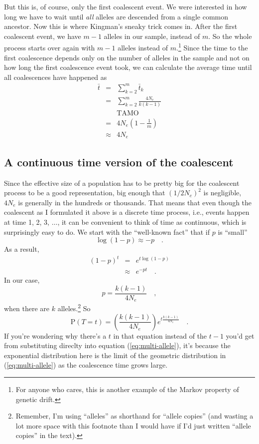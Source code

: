 But this is, of course, only the first coalescent event. We were
interested in how long we have to wait until {\it all\/} alleles are
descended from a single common ancestor. Now this is where Kingman's
sneaky trick comes in. After the first coalescent event, we have $m-1$
alleles in our sample, instead of $m$. So the whole process starts
over again with $m-1$ alleles instead of $m$.\footnote{For anyone who
  cares, this is another example of the Markov property of genetic
  drift.} Since the time to the
first coalescence depends only on the number of alleles in the sample
and not on how long the first coalescence event took, we can calculate
the average time until all coalescences have happened
as
\begin{eqnarray*}
\bar t &=& \sum_{k=2}^m \bar t_k \\
       &=& \sum_{k=2}^m \frac{4N_e}{k(k-1)} \\
       && \mbox{TAMO} \\
       &=& 4N_e\left(1 - \frac{1}{m}\right) \\
       &\approx& 4N_e
\end{eqnarray*}

\subsection*{A continuous time version of the coalescent}

Since the effective size of a population has to be pretty big for the
coalescent process to be a good representation, big enough that
$(1/2N_e)^2$ is negligible, $4N_e$ is generally in the hundreds or
thousands. That means that even though the coalescent as I formulated
it above is a discrete time process, i.e., events happen at time 1, 2,
3, $\dots$, it can be convenient to think of time as continuous, which
is surprisingly easy to do. We start with the ``well-known fact'' that
if $p$ is ``small''
\[
\log(1-p) \approx -p \quad .
\]
As a result,
\begin{eqnarray*}
(1 - p)^t &=& e^{t \log(1-p)} \\
          &\approx& e^{-pt} \quad .
\end{eqnarray*}
In our case,
\[
p = \frac{k(k-1)}{4N_e} \quad ,
\]
when there are $k$ alleles.\footnote{Remember, I'm using ``alleles''
  as shorthand for ``allele copies'' (and wasting a lot more space
  with this footnote than I would have if I'd just written ``allele
  copies'' in the text).} So
\[
\mbox{P}(T = t) = \left(\frac{k(k-1)}{4N_e}\right)e^{t\frac{k(k-1)}{4N_e}} \quad .
\]
If you're wondering why there's a $t$ in that equation instead of the
$t-1$ you'd get from substituting direclty into equation
(\ref{eq:multi-allele}), it's because the exponential distribution
here is the limit of the geometric distribution in
(\ref{eq:multi-allele}) as the coalescence time grows large.


